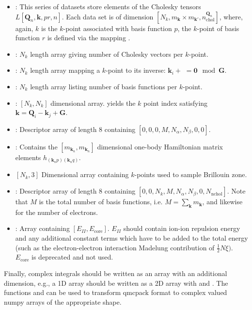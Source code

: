 \begin{itemize}
    \item {}: This series of datasets store elements of the Cholesky tensors $L[\mathbf{Q}_n,\mathbf{k},pr,n]$. Each data set is of dimension $[N_k,m_{\mathbf{k}}\times m_{\mathbf{k}'},n^{\mathbf{Q}_n}_\mathrm{chol}]$, where, again, $k$ is the $k$-point associated with basis function $p$, the $k$-point of basis function $r$ is defined via the mapping .
    \item {}: $N_k$ length array giving number of Cholesky vectors per $k$-point.
    \item {}: $N_k$ length array mapping a $k$-point to its inverse: $\mathbf{k}_i+$ $= \mathbf{0} \mod \mathbf{G}$.
    \item {}: $N_k$ length array listing number of basis functions per $k$-point.
    \item {}: $[N_k,N_k]$ dimensional array.  yields the $k$ point index satisfying $\mathbf{k}=\mathbf{Q}_i-\mathbf{k}_j+\mathbf{G}$.
    \item {}: Descriptor array of length 8 containing $[0,0,0,M,N_\alpha,N_\beta,0,0]$.
    \item {}: Contains the $[m_{\mathbf{k}_n},m_{\mathbf{k}_n}]$ dimensional one-body Hamiltonian matrix elements $h_{(\mathbf{k}_{n}p)(\mathbf{k}_{n}q)}$.
    \item {} $[N_k,3]$ Dimensional array containing $k$-points used to sample Brillouin zone.
    \item {}: Descriptor array of length 8 containing $[0,0,N_k,M,N_\alpha,N_\beta,0,N_\mathrm{nchol}]$. Note that $M$ is the total number of basis functions, i.e. $M=\sum_\mathbf{k} m_\mathbf{k}$, and likewise for the number of electrons.
    \item {}: Array containing $[E_{II}, E_{\mathrm{core}}]$. $E_{II}$ should contain ion-ion repulsion energy and any additional constant terms which have to be added to the total energy (such as the electron-electron interaction Madelung contribution of $\frac{1}{2} N \xi )$. $E_{\mathrm{core}}$ is deprecated and not used.
\end{itemize}

Finally, complex integrals should be written as an array with an additional dimension, e.g., a 1D array should be written as a 2D array with  and . The functions  and  can be used to transform qmcpack format to complex valued numpy arrays of the appropriate shape.
